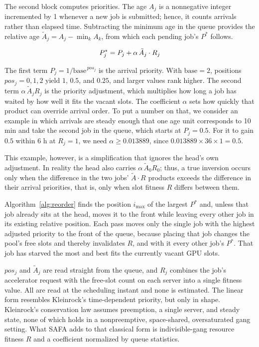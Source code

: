 \documentclass{ieeetj}
\begin{document}
The second block computes priorities. The age $A_j$ is a nonnegative integer incremented by 1 whenever a new job is submitted; hence, it counts arrivals rather than elapsed time. Subtracting the minimum age in the queue provides the relative age $\tilde A_j=A_j-\min_k A_k$, from which each pending job's $P^*$ follows.

\begin{equation}
P^*_j = P_j + \alpha\, \tilde A_j \cdot R_j
\label{eq:01}
\vspace{2pt}
\end{equation}

The first term $P_j=1/\text{base}^{\,pos_j}$ is the arrival priority. With $\text{base}=2$, positions $pos_j=0,1,2$ yield $1$, $0.5$, and $0.25$, and larger values rank higher. The second term $\alpha\,\tilde A_j R_j$ is the priority adjustment, which multiplies how long a job has waited by how well it fits the vacant slots. The coefficient $\alpha$ sets how quickly that product can override arrival order. To put a number on that, we consider an example in which arrivals are steady enough that one age unit corresponds to 10 min and take the second job in the queue, which starts at $P_j=0.5$. For it to gain $0.5$ within 6 h at $R_j=1$, we need $\alpha\ge0.013889$, since $0.013889\times36\times1=0.5$.

This example, however, is a simplification that ignores the head's own adjustment. In reality the head also carries $\alpha\,\tilde A_0 R_0$; thus, a true inversion occurs only when the difference in the two jobs' $\tilde A\cdot R$ products exceeds the difference in their arrival priorities, that is, only when slot fitness $R$ differs between them.

Algorithm~\ref{alg:reorder} finds the position $i_{\max}$ of the largest $P^*$ and, unless that job already sits at the head, moves it to the front while leaving every other job in its existing relative position. Each pass moves only the single job with the highest adjusted priority to the front of the queue, because placing that job changes the pool's free slots and thereby invalidates $R$, and with it every other job's $P^*$. That job has starved the most and best fits the currently vacant GPU slots.

$pos_j$ and $\tilde A_j$ are read straight from the queue, and $R_j$ combines the job's accelerator request with the free-slot count on each server into a single fitness value. All are read at the scheduling instant and none is estimated. The linear form resembles Kleinrock's time-dependent priority\cite{kleinrock1976queueing}, but only in shape. Kleinrock's conservation law assumes preemption, a single server, and steady state, none of which holds in a nonpreemptive, space-shared, oversaturated gang setting. What SAFA adds to that classical form is indivisible-gang resource fitness $R$ and a coefficient normalized by queue statistics.
\end{document}
